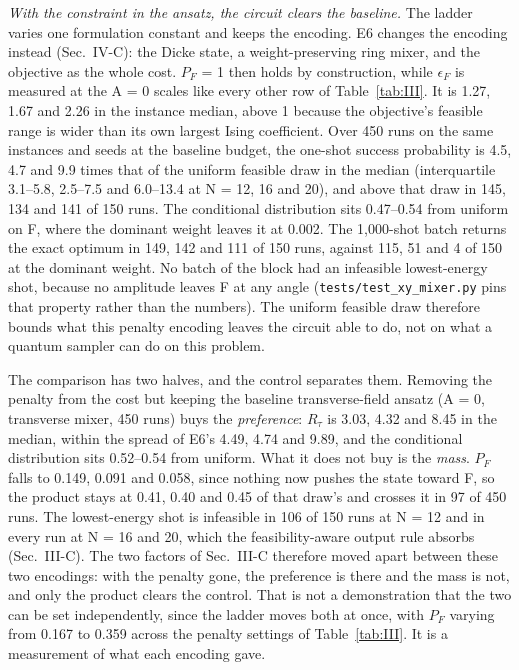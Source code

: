 \documentclass{ieeeaccess}
\begin{document}
\textit{With the constraint in the ansatz, the circuit clears the baseline.} The ladder varies one formulation constant and keeps the encoding. E6 changes the encoding instead (Sec.~IV-C): the Dicke state, a weight-preserving ring mixer, and the objective as the whole cost. $P_{F}$ = 1 then holds by construction, while $\epsilon_{F}$ is measured at the A = 0 scales like every other row of Table~\ref{tab:III}. It is 1.27, 1.67 and 2.26 in the instance median, above 1 because the objective's feasible range is wider than its own largest Ising coefficient. Over 450 runs on the same instances and seeds at the baseline budget, the one-shot success probability is 4.5, 4.7 and 9.9 times that of the uniform feasible draw in the median (interquartile 3.1--5.8, 2.5--7.5 and 6.0--13.4 at N = 12, 16 and 20), and above that draw in 145, 134 and 141 of 150 runs. The conditional distribution sits 0.47--0.54 from uniform on F, where the dominant weight leaves it at 0.002. The 1,000-shot batch returns the exact optimum in 149, 142 and 111 of 150 runs, against 115, 51 and 4 of 150 at the dominant weight. No batch of the block had an infeasible lowest-energy shot, because no amplitude leaves F at any angle (\texttt{tests/test\_xy\_mixer.py} pins that property rather than the numbers). The uniform feasible draw therefore bounds what this penalty encoding leaves the circuit able to do, not on what a quantum sampler can do on this problem.


The comparison has two halves, and the control separates them. Removing the penalty from the cost but keeping the baseline transverse-field ansatz (A = 0, transverse mixer, 450 runs) buys the \textit{preference}: $R_{\tau}$ is 3.03, 4.32 and 8.45 in the median, within the spread of E6's 4.49, 4.74 and 9.89, and the conditional distribution sits 0.52--0.54 from uniform. What it does not buy is the \textit{mass}. $P_{F}$ falls to 0.149, 0.091 and 0.058, since nothing now pushes the state toward F, so the product stays at 0.41, 0.40 and 0.45 of that draw's and crosses it in 97 of 450 runs. The lowest-energy shot is infeasible in 106 of 150 runs at N = 12 and in every run at N = 16 and 20, which the feasibility-aware output rule absorbs (Sec.~III-C). The two factors of Sec.~III-C therefore moved apart between these two encodings: with the penalty gone, the preference is there and the mass is not, and only the product clears the control. That is not a demonstration that the two can be set independently, since the ladder moves both at once, with $P_{F}$ varying from 0.167 to 0.359 across the penalty settings of Table~\ref{tab:III}. It is a measurement of what each encoding gave.
\end{document}
